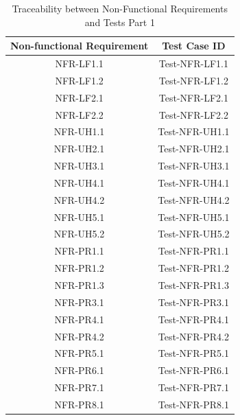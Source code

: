 \documentclass[12pt, titlepage]{article}
\begin{document}
\begin{table}[H]
    \centering
    \begin{tabular}{|c|c|}
    \hline
    Non-functional Requirement & Test Case ID\\
    \hline
    NFR-LF1.1 & Test-NFR-LF1.1\\
    \hline
    NFR-LF1.2 & Test-NFR-LF1.2\\
    \hline
    NFR-LF2.1 & Test-NFR-LF2.1\\
    \hline
    NFR-LF2.2 & Test-NFR-LF2.2\\
    \hline
    NFR-UH1.1 & Test-NFR-UH1.1\\
    \hline
    NFR-UH2.1 & Test-NFR-UH2.1\\
    \hline
    NFR-UH3.1 & Test-NFR-UH3.1\\
    \hline
    NFR-UH4.1 & Test-NFR-UH4.1\\
    \hline
    NFR-UH4.2 & Test-NFR-UH4.2\\
    \hline
    NFR-UH5.1 & Test-NFR-UH5.1\\
    \hline
    NFR-UH5.2 & Test-NFR-UH5.2\\
    \hline
    NFR-PR1.1 & Test-NFR-PR1.1\\
    \hline
    NFR-PR1.2 & Test-NFR-PR1.2\\
    \hline
    NFR-PR1.3 & Test-NFR-PR1.3\\
    \hline
    NFR-PR3.1 & Test-NFR-PR3.1\\
    \hline
    NFR-PR4.1 & Test-NFR-PR4.1\\
    \hline
    NFR-PR4.2 & Test-NFR-PR4.2\\
    \hline
    NFR-PR5.1 & Test-NFR-PR5.1\\
    \hline
    NFR-PR6.1 & Test-NFR-PR6.1\\
    \hline
    NFR-PR7.1 & Test-NFR-PR7.1\\
    \hline
    NFR-PR8.1 & Test-NFR-PR8.1\\
    \hline
    \end{tabular}
    \caption{Traceability between Non-Functional Requirements and Tests Part 1}
\end{table}
\newpage
\end{document}
